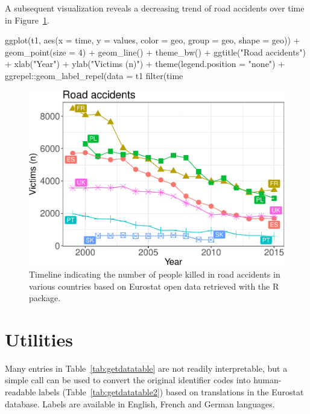 A subsequent visualization reveals a decreasing trend of road accidents over time in Figure~\ref{fig:transport}.

\begin{example}
ggplot(t1, aes(x = time, y = values, color = geo, group = geo, shape = geo)) +
  geom_point(size = 4) + geom_line() + theme_bw() +
  ggtitle("Road accidents") + xlab("Year") + ylab("Victims (n)") +
  theme(legend.position = "none") +
  ggrepel::geom_label_repel(data = t1 %
  filter(time %
\end{example}


\begin{figure}[h]
  \begin{center}
  \includegraphics{2017-manu-roadacc-1}
  \end{center}
  \caption{Timeline indicating the number of people killed in road accidents in various countries based on Eurostat open data retrieved with the  R package.}
  \label{fig:transport}
\end{figure}




\section{Utilities}

Many entries in Table~\ref{tab:getdatatable} are not readily interpretable, but a simple call  can be used to convert the original identifier codes into human-readable labels (Table~\ref{tab:getdatatable2}) based on translations in the Eurostat database. Labels are available in English, French and German languages.


